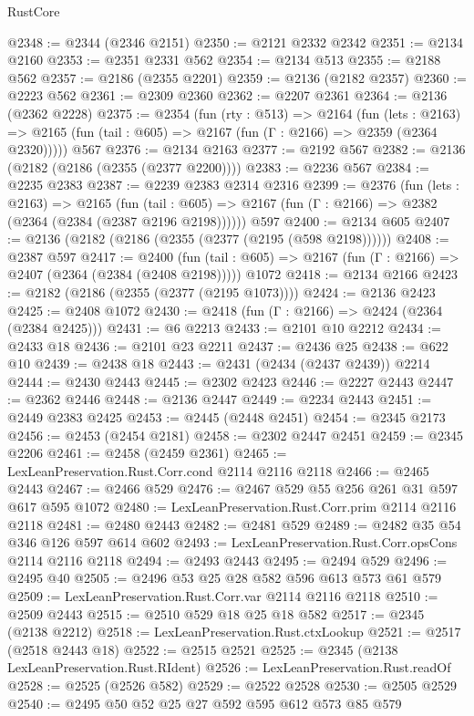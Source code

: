 \begin{lexlean}{RustCore}
\begin{coremodule}
@2348 := @2344 (@2346 @2151)
@2350 := @2121 @2332 @2342
@2351 := @2134 @2160
@2353 := @2351 @2331 @562
@2354 := @2134 @513
@2355 := @2188 @562
@2357 := @2186 (@2355 @2201)
@2359 := @2136 (@2182 @2357)
@2360 := @2223 @562
@2361 := @2309 @2360
@2362 := @2207 @2361
@2364 := @2136 (@2362 @2228)
@2375 := @2354
    (fun (rty : @513) =>
    @2164
      (fun (lets : @2163) =>
      @2165 (fun (tail : @605) => @2167 (fun (Γ : @2166) => @2359 (@2364 @2320)))))
    @567
@2376 := @2134 @2163
@2377 := @2192 @567
@2382 := @2136 (@2182 (@2186 (@2355 (@2377 @2200))))
@2383 := @2236 @567
@2384 := @2235 @2383
@2387 := @2239 @2383 @2314 @2316
@2399 := @2376
    (fun (lets : @2163) =>
    @2165
      (fun (tail : @605) => @2167 (fun (Γ : @2166) => @2382 (@2364 (@2384 (@2387 @2196 @2198))))))
    @597
@2400 := @2134 @605
@2407 := @2136 (@2182 (@2186 (@2355 (@2377 (@2195 (@598 @2198))))))
@2408 := @2387 @597
@2417 := @2400
    (fun (tail : @605) => @2167 (fun (Γ : @2166) => @2407 (@2364 (@2384 (@2408 @2198)))))
    @1072
@2418 := @2134 @2166
@2423 := @2182 (@2186 (@2355 (@2377 (@2195 @1073))))
@2424 := @2136 @2423
@2425 := @2408 @1072
@2430 := @2418 (fun (Γ : @2166) => @2424 (@2364 (@2384 @2425)))
@2431 := @6 @2213
@2433 := @2101 @10 @2212
@2434 := @2433 @18
@2436 := @2101 @23 @2211
@2437 := @2436 @25
@2438 := @622 @10
@2439 := @2438 @18
@2443 := @2431 (@2434 (@2437 @2439)) @2214
@2444 := @2430 @2443
@2445 := @2302 @2423
@2446 := @2227 @2443
@2447 := @2362 @2446
@2448 := @2136 @2447
@2449 := @2234 @2443
@2451 := @2449 @2383 @2425
@2453 := @2445 (@2448 @2451)
@2454 := @2345 @2173
@2456 := @2453 (@2454 @2181)
@2458 := @2302 @2447 @2451
@2459 := @2345 @2206
@2461 := @2458 (@2459 @2361)
@2465 := LexLeanPreservation.Rust.Corr.cond @2114 @2116 @2118
@2466 := @2465 @2443
@2467 := @2466 @529
@2476 := @2467 @529 @55 @256 @261 @31 @597 @617 @595 @1072
@2480 := LexLeanPreservation.Rust.Corr.prim @2114 @2116 @2118
@2481 := @2480 @2443
@2482 := @2481 @529
@2489 := @2482 @35 @54 @346 @126 @597 @614 @602
@2493 := LexLeanPreservation.Rust.Corr.opsCons @2114 @2116 @2118
@2494 := @2493 @2443
@2495 := @2494 @529
@2496 := @2495 @40
@2505 := @2496 @53 @25 @28 @582 @596 @613 @573 @61 @579
@2509 := LexLeanPreservation.Rust.Corr.var @2114 @2116 @2118
@2510 := @2509 @2443
@2515 := @2510 @529 @18 @25 @18 @582
@2517 := @2345 (@2138 @2212)
@2518 := LexLeanPreservation.Rust.ctxLookup
@2521 := @2517 (@2518 @2443 @18)
@2522 := @2515 @2521
@2525 := @2345 (@2138 LexLeanPreservation.Rust.RIdent)
@2526 := LexLeanPreservation.Rust.readOf
@2528 := @2525 (@2526 @582)
@2529 := @2522 @2528
@2530 := @2505 @2529
@2540 := @2495 @50 @52 @25 @27 @592 @595 @612 @573 @85 @579

\end{coremodule}
\end{lexlean}
